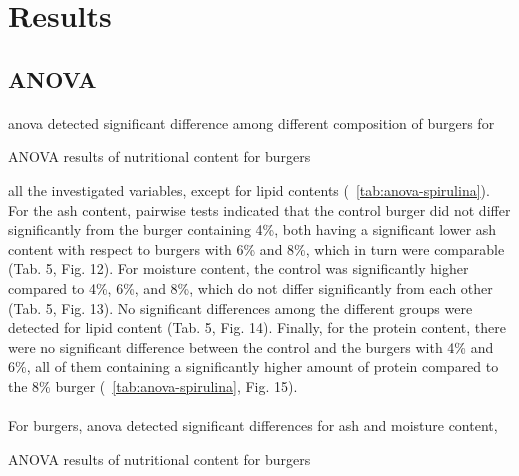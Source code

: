 
\section{Results}
\subsection{ANOVA}
\paragraph{}
\gls{anova} detected significant difference among different composition of  burgers for 

\begin{table}[H]
	\caption{ANOVA results of nutritional content for  burgers}
	\label{tab:anova-spirulina}
	\centering
	\scriptsize
	
\end{table}

all the investigated variables, except for lipid contents (\tab{}~\ref{tab:anova-spirulina}). For the ash content, pairwise tests indicated that the control burger did not differ significantly from the burger containing 4\%, both having a significant lower ash content with respect to burgers with 6\% and 8\%, which in turn were comparable (Tab. 5, Fig. 12).
For moisture content, the control was significantly higher compared to 4\%, 6\%, and 8\%, which do not differ significantly from each other (Tab. 5, Fig. 13). No significant differences among the different groups were detected for lipid content (Tab. 5, Fig. 14). Finally, for the protein content, there were no significant difference between the control and the burgers with 4\% and 6\%, all of them containing a significantly higher amount of protein compared to the 8\% burger (\tab{}~\ref{tab:anova-spirulina}, Fig. 15).



\paragraph{}
For  burgers, \gls{anova} detected significant differences for ash and moisture content, 

\begin{table}[H]
	\caption{ANOVA results of nutritional content for  burgers}
	\label{tab:anova-chlorella}
	\centering
	\scriptsize
	
\end{table}

